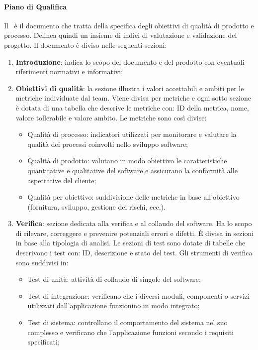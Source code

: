 \paragraph{Piano di Qualifica}
Il \PdQ\ è il documento che tratta della specifica degli obiettivi di qualità di prodotto e processo. Delinea quindi un insieme di indici di valutazione e validazione del progetto.
Il documento è diviso nelle seguenti sezioni:
\begin{enumerate}
  \item \textbf{Introduzione}: indica lo scopo del documento e del prodotto con eventuali riferimenti normativi e informativi;
  \item \textbf{Obiettivi di qualità}: la sezione illustra i valori accettabili e ambiti per le metriche individuate dal team. Viene divisa per metriche e ogni sotto sezione è dotata di una tabella che descrive le metriche con: ID della metrica, nome, valore tollerabile e valore ambito. Le metriche sono così divise:
  \begin{itemize}
    \item Qualità di processo: indicatori utilizzati per monitorare e valutare la qualità dei processi coinvolti nello sviluppo software;
    \item Qualità di prodotto: valutano in modo obiettivo le caratteristiche quantitative e qualitative del software e assicurano la conformità alle aspettative del cliente;
    \item Qualità per obiettivo: suddivisione delle metriche in base all'obiettivo (fornitura, sviluppo, gestione dei rischi, ecc.).
  \end{itemize}
  \item \textbf{Verifica}: sezione dedicata alla verifica e al collaudo del software. Ha lo scopo di rilevare, correggere e prevenire potenziali errori e difetti. È divisa in sezioni in base alla tipologia di analisi. Le sezioni di test sono dotate di tabelle che descrivono i test con: ID, descrizione e stato del test. Gli strumenti di verifica sono suddivisi in:
  \begin{itemize}
    \item Test di unità: attività di collaudo di singole  del software;
    \item Test di integrazione: verificano che i diversi moduli, componenti o servizi utilizzati dall’applicazione funzionino in modo integrato;
    \item Test di sistema: controllano il comportamento del sistema nel suo complesso e verificano che l’applicazione funzioni secondo i requisiti specificati;

\end{itemize}
\end{enumerate}
